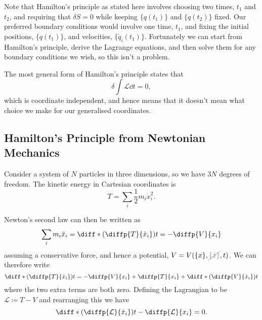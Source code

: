 \documentclass[fleqn]{NotesClass}
\newcommand*{\nodependence}[1]{\textcolor{gray}{\cancel{#1}}}
\newcommand*{\lagrangian}{\mathcal{L}}
\begin{document}
    Note that Hamilton's principle as stated here involves choosing two times, \(t_1\) and \(t_2\), and requiring that \(\delta S = 0\) while keeping \(\{q(t_1)\}\) and \(\{q(t_2)\}\) fixed.
    Our preferred boundary conditions would involve one time, \(t_1\), and fixing the initial positions, \(\{q(t_1)\}\), and velocities, \(\{\dot{q}_i(t_1)\}\).
    Fortunately we can start from Hamilton's principle, derive the Lagrange equations, and then solve them for any boundary conditions we wish, so this isn't a problem.
    
    The most general form of Hamilton's principle states that
    \begin{equation}
        \delta \int \lagrangian \dd{t} = 0,
    \end{equation}
    which is coordinate independent, and hence means that it doesn't mean what choice we make for our generalised coordinates.
    
    \subsection{Hamilton's Principle from Newtonian Mechanics}
    Consider a system of \(N\) particles in three dimensions, so we have \(3N\) degrees of freedom.
    The kinetic energy in Cartesian coordinates is
    \begin{equation}
        T = \sum_i \frac{1}{2}m_i\dot{x}_i^2.
    \end{equation}
    
    Newton's second law can then be written as
    \begin{equation}
        \sum_{i} m_i\ddot{x}_i = \diff*{\left( \diffp{T}{\dot{x}_i} \right)}{t} = -\diffp{V}{x_i}
    \end{equation}
    assuming a conservative force, and hence a potential, \(V = V(\{x\}, \nodependence{\{\dot{x}\}}, t)\).
    We can therefore write
    \begin{equation}
        \diff*{\left( \diffp{T}{\dot{x}_i} \right)}{t} = -\diffp{V}{x_i} + \diffp{T}{x_i} + \diff*{\left( \diffp{V}{\dot{x}_i} \right)}{t}
    \end{equation}
    where the two extra terms are both zero.
    Defining the Lagrangian to be \(\lagrangian \coloneqq T - V\) and rearranging this we have
    \begin{equation}
        \diff*{\left( \diffp{\lagrangian}{\dot{x}_i} \right)}{t} - \diffp{\lagrangian}{x_i} = 0.
    \end{equation}
    
\end{document}
